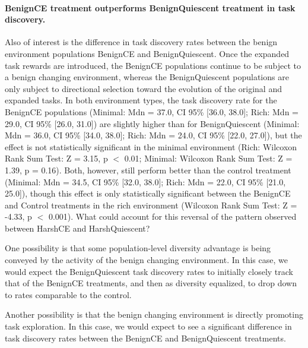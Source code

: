 \documentclass[PhD]{msu-thesis}
\begin{document}
\paragraph{BenignCE treatment outperforms BenignQuiescent treatment in task discovery.}
Also of interest
is the difference in task discovery rates between the benign environment populations BenignCE and BenignQuiescent. Once the expanded task rewards are introduced, the BenignCE populations continue to be subject to a benign changing environment, whereas the BenignQuiescent populations are only subject to directional selection toward the evolution of the original and expanded tasks. In both environment types, the task discovery rate for the BenignCE populations (Minimal: Mdn = 37.0, CI 95\% [36.0, 38.0]; Rich: Mdn = 29.0, CI 95\% [26.0, 31.0]) are slightly higher than for BenignQuiescent (Minimal: Mdn = 36.0, CI 95\% [34.0, 38.0]; Rich: Mdn = 24.0, CI 95\% [22.0, 27.0]), but the effect is not statistically significant in the minimal environment (Rich: Wilcoxon Rank Sum Test: Z = 3.15, p $<$ 0.01; Minimal: Wilcoxon Rank Sum Test: Z = 1.39, p = 0.16). Both, however, still perform better than the control treatment (Minimal: Mdn = 34.5, CI 95\% [32.0, 38.0]; Rich: Mdn = 22.0, CI 95\% [21.0, 25.0]), though this effect is only statistically significant between the BenignCE and Control treatments in the rich environment (Wilcoxon Rank Sum Test: Z = -4.33, p $<$ 0.001). What could account for this reversal of the pattern observed between HarshCE and HarshQuiescent?


One possibility is that some population-level diversity advantage is being conveyed by the activity of the benign changing environment. In this case, we would expect the BenignQuiescent task discovery rates to initially closely track that of the BenignCE treatments, and then as diversity equalized, to drop down to rates comparable to the control.

Another possibility is that the benign changing environment is directly promoting task exploration. In this case, we would expect to see a significant difference in task discovery rates between the BenignCE and BenignQuiescent treatments.
\end{document}
